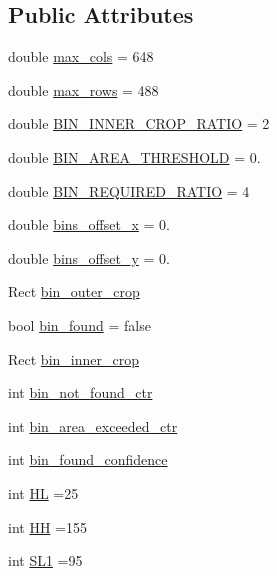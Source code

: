 \subsection*{Public Attributes}
\begin{DoxyCompactItemize}
\item 
double \hyperlink{classAlignBin_af984c9ffbeeebfae750ac2237c518ec2}{max\+\_\+cols} = 648
\item 
double \hyperlink{classAlignBin_a193530ae6dfca9e25a6b77e19b6f4f52}{max\+\_\+rows} = 488
\item 
double \hyperlink{classAlignBin_a130959da7ec516d944a30541c1d674f7}{B\+I\+N\+\_\+\+I\+N\+N\+E\+R\+\_\+\+C\+R\+O\+P\+\_\+\+R\+A\+T\+IO} = 2
\item 
double \hyperlink{classAlignBin_a5c32224007789c06f6be5714512ca506}{B\+I\+N\+\_\+\+A\+R\+E\+A\+\_\+\+T\+H\+R\+E\+S\+H\+O\+LD} = 0.
\item 
double \hyperlink{classAlignBin_adedde6dfe9b6e35c372fa034cf401351}{B\+I\+N\+\_\+\+R\+E\+Q\+U\+I\+R\+E\+D\+\_\+\+R\+A\+T\+IO} = 4
\item 
double \hyperlink{classAlignBin_ad994bd3d6dcef6be1f1aca871e6ed1e1}{bins\+\_\+offset\+\_\+x} = 0.
\item 
double \hyperlink{classAlignBin_ae70b486d82daa5ee833b7cd2bd7a8747}{bins\+\_\+offset\+\_\+y} = 0.
\item 
Rect \hyperlink{classAlignBin_af344ab74a824162b23ca841b8a4048df}{bin\+\_\+outer\+\_\+crop}
\item 
bool \hyperlink{classAlignBin_a4bf78a8707f32a306a8871c438c93fc5}{bin\+\_\+found} = false
\item 
Rect \hyperlink{classAlignBin_a0f14b89a2a1f3567525de7c8295aca56}{bin\+\_\+inner\+\_\+crop}
\item 
int \hyperlink{classAlignBin_a261b3b8844de979b325428c812885d84}{bin\+\_\+not\+\_\+found\+\_\+ctr}
\item 
int \hyperlink{classAlignBin_abc20afd816e513b776e6a14ecd522379}{bin\+\_\+area\+\_\+exceeded\+\_\+ctr}
\item 
int \hyperlink{classAlignBin_a17f0142a68dbcdd10faf27361e5e4098}{bin\+\_\+found\+\_\+confidence}
\item 
int \hyperlink{classAlignBin_abf0dbeda76c43acd0a2b486ec177d9d2}{HL} =25
\item 
int \hyperlink{classAlignBin_a30665e4f9a2b3dc078436dc07651aa37}{HH} =155
\item 
int \hyperlink{classAlignBin_ac78c5993ded5dd986f1589783d7b3348}{S\+L1} =95
\item 

\end{DoxyCompactItemize}
